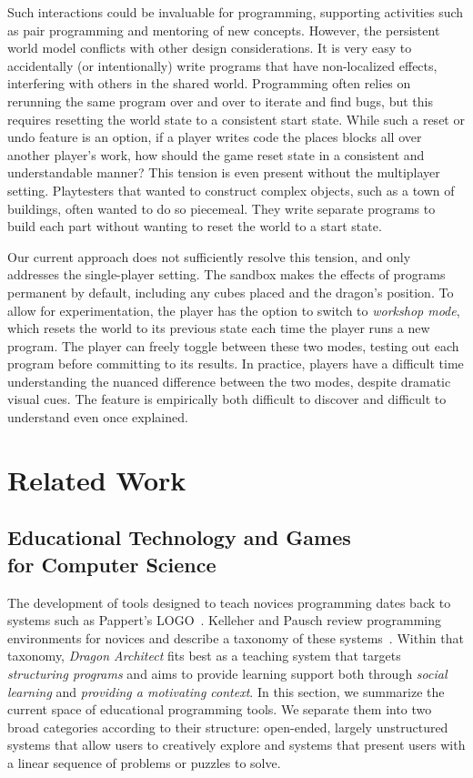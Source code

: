 \documentclass{sig-alternate}
\newcommand{\gametitle}{{\emph{Dragon Architect}}}
\begin{document}
Such interactions could be invaluable for programming, supporting activities such as pair programming and mentoring of new concepts.
However, the persistent world model conflicts with other design considerations.
It is very easy to accidentally (or intentionally) write programs that have non-localized effects, interfering with others in the shared world.
Programming often relies on rerunning the same program over and over to iterate and find bugs, but this requires resetting the world state to a consistent start state.
While such a reset or undo feature is an option, if a player writes code the places blocks all over another player's work, how should the game reset state in a consistent and understandable manner?
This tension is even present without the multiplayer setting.
Playtesters that wanted to construct complex objects, such as a town of buildings, often wanted to do so piecemeal. They write separate programs to build each part without wanting to reset the world to a start state.

Our current approach does not sufficiently resolve this tension, and only addresses the single-player setting.
The sandbox makes the effects of programs permanent by default, including any cubes placed and the dragon's position.
To allow for experimentation, the player has the option to switch to \emph{workshop mode}, which resets the world to its previous state each time the player runs a new program. 
The player can freely toggle between these two modes, testing out each program before committing to its results. 
In practice, players have a difficult time understanding the nuanced difference between the two modes, despite dramatic visual cues.
The feature is empirically both difficult to discover and difficult to understand even once explained.

\section{Related Work}

\subsection{Educational Technology and Games\\for Computer Science}

The development of tools designed to teach novices programming dates back to systems such as Pappert's LOGO~\cite{papert80mindstorms}.
Kelleher and Pausch review programming environments for novices and describe a taxonomy of these systems~\cite{kelleher2005lowering}.
Within that taxonomy, \gametitle{} fits best as a teaching system that targets \emph{structuring programs} and aims to provide learning support both through \emph{social learning} and \emph{providing a motivating context}. 
In this section, we summarize the current space of educational programming tools. 
We separate them into two broad categories according to their structure: open-ended, largely unstructured systems that allow users to creatively explore and systems that present users with a linear sequence of problems or puzzles to solve. 
\end{document}
